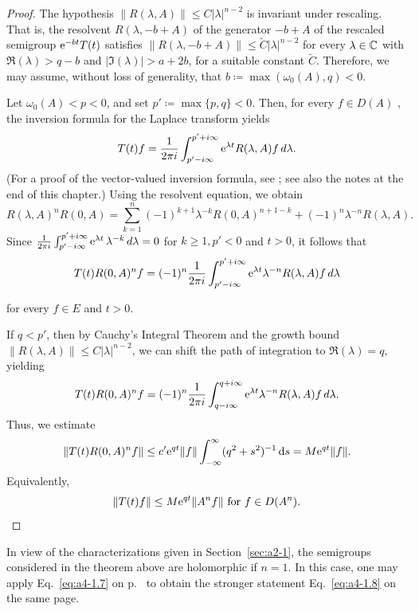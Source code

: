 \begin{proof} 
The hypothesis $\| R(\lambda, A) \| \leq C | \lambda |^{n-2}$ is invariant under rescaling. 
That is, the resolvent $R(\lambda, -b+A)$ of the generator $-b+A$ of the rescaled semigroup $\mathrm{e}^{-bt} T(t)$ satisfies
$\| R(\lambda, -b+A) \| \leq \tilde{C} | \lambda |^{n-2}$ for every $\lambda \in \mathbb{C}$ with $\Re(\lambda) > q-b$ and $| \Im(\lambda) | > a+2b$, for a suitable constant $\tilde{C}$. 
Therefore, we may assume, without loss of generality, that $b \coloneq  \max(\omega_{0}(A), q) < 0$. 

Let $\omega_{0}(A) < p < 0$, and set $p' \coloneq  \max\{p, q\} < 0$. 
Then, for every $f \in D(A)$ , the inversion formula for the Laplace transform yields 
\begin{equation} \label{eq:a4-1.12}
T(t) f = \frac{1}{2\pi i} \int_{p' - i\infty}^{p' + i\infty} \mathrm{e}^{\lambda t} R(\lambda, A) f \, d\lambda.
\end{equation}
 (For a proof of the vector-valued inversion formula, see \textcite[p.~66]{widder:1946}; see also the notes at the end of this chapter.)
Using the resolvent equation, we obtain 
\[ 
R(\lambda, A)^n R(0, A) = \sum_{k=1}^{n} (-1)^{k+1} \lambda^{-k} R(0, A)^{n+1-k} + (-1)^n \lambda^{-n} R(\lambda, A).
\]
Since 
$ \frac {1}{2\pi i} \int_{p' - i\infty}^{p' + i\infty} \mathrm{e}^{\lambda t} \, \lambda^{-k} \, d\lambda = 0 $ for $ k \geq 1, p' < 0 $ and $ t > 0$, it follows that
 \begin{equation}\label{eq:a4-1.13}
   T(t) R(0, A)^n f = (-1)^n \frac{1}{2\pi i} \int_{p' - i\infty}^{p' + i\infty} \mathrm{e}^{\lambda t} \lambda^{-n} R(\lambda, A) f \, d\lambda
    \end{equation}
    
 for every $f \in E$ and $t > 0$.
    
 If\/ $q < p'$, then by Cauchy's Integral Theorem and the growth bound $\| R(\lambda, A) \| \leq C | \lambda |^{n-2}$, we can shift the path of integration to 
 $\Re(\lambda) = q$, yielding
\[
    T(t) R(0, A)^n f = (-1)^n \frac{1}{2\pi i} \int_{q - i\infty}^{q + i\infty} \mathrm{e}^{\lambda t} \lambda^{-n} R(\lambda, A) f \, d\lambda.
\]
Thus, we estimate  
\[
\| T(t) R(0,A)^n f \| \leq c' \eu^{q t} \| f \| \int_{-\infty}^{\infty} (q^2 + s^2)^{-1}\ds = M \eu^{q t} \| f \|.
\]
Equivalently,
\begin{equation*}
\| T(t) f \| \leq M \eu^{q t} \| A^n f \| \text{ for $f \in D(A^n)$.}
\qedhere
\end{equation*}
\end{proof}
In view of the characterizations given in Section~\ref{sec:a2-1},  the semigroups considered in the theorem above are holomorphic if\/ $ n = 1 $. 
In this case, one may apply Eq.~\eqref{eq:a4-1.7} on p.~\pageref{eq:a4-1.7} to obtain the stronger statement Eq.~\eqref{eq:a4-1.8}
on the same page.%

